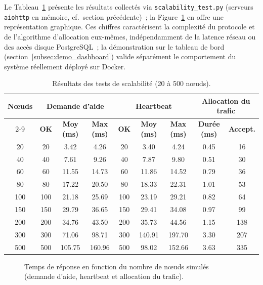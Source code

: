 Le Tableau~\ref{tab:scalabilite} présente les résultats collectés via \texttt{scalability\_test.py} (serveurs \texttt{aiohttp} en mémoire, cf.~section précédente)~; la Figure~\ref{fig:scalabilite} en offre une représentation graphique. Ces chiffres caractérisent la complexité du protocole et de l'algorithme d'allocation eux-mêmes, indépendamment de la latence réseau ou des accès disque PostgreSQL~; la démonstration sur le tableau de bord (section~\ref{subsec:demo_dashboard}) valide séparément le comportement du système réellement déployé sur Docker.




\begin{table}[H]
\centering
\caption{Résultats des tests de scalabilité (20 à 500 nœuds).}
\label{tab:scalabilite}
\small
\renewcommand{\arraystretch}{1.35}
\begin{tabular}{|c|c|c|c|c|c|c|c|c|}
\hline
\multirow{2}{*}{\textbf{Nœuds}} &
\multicolumn{3}{c|}{\textbf{Demande d'aide}} &
\multicolumn{3}{c|}{\textbf{Heartbeat}} &
\multicolumn{2}{c|}{\textbf{Allocation du trafic}} \\
\cline{2-9}
& \textbf{OK} & \textbf{Moy (ms)} & \textbf{Max (ms)}
& \textbf{OK} & \textbf{Moy (ms)} & \textbf{Max (ms)}
& \textbf{Durée (ms)} & \textbf{Accept.} \\
\hline
 20 &  20 &   3.42 &   4.26 &  20 &   3.40 &   4.24 & 0.45 &  16 \\
 40 &  40 &   7.61 &   9.26 &  40 &   7.87 &   9.80 & 0.51 &  30 \\
 60 &  60 &  11.55 &  14.73 &  60 &  11.86 &  14.52 & 0.79 &  36 \\
 80 &  80 &  17.22 &  20.50 &  80 &  18.33 &  22.31 & 1.01 &  53 \\
100 & 100 &  21.18 &  25.69 & 100 &  23.19 &  29.21 & 0.82 &  64 \\
150 & 150 &  29.79 &  36.65 & 150 &  29.41 &  34.08 & 0.97 &  99 \\
200 & 200 &  34.76 &  43.50 & 200 &  35.73 &  44.56 & 1.15 & 138 \\
300 & 300 &  71.06 &  98.71 & 300 & 140.91 & 197.70 & 3.30 & 207 \\
500 & 500 & 105.75 & 160.96 & 500 &  98.02 & 152.66 & 3.63 & 335 \\
\hline
\end{tabular}
\end{table}




\begin{figure}[H]
\centering
{}
\caption{Temps de réponse en fonction du nombre de nœuds simulés (demande d'aide, heartbeat et allocation du trafic).}
\label{fig:scalabilite}
\end{figure}

